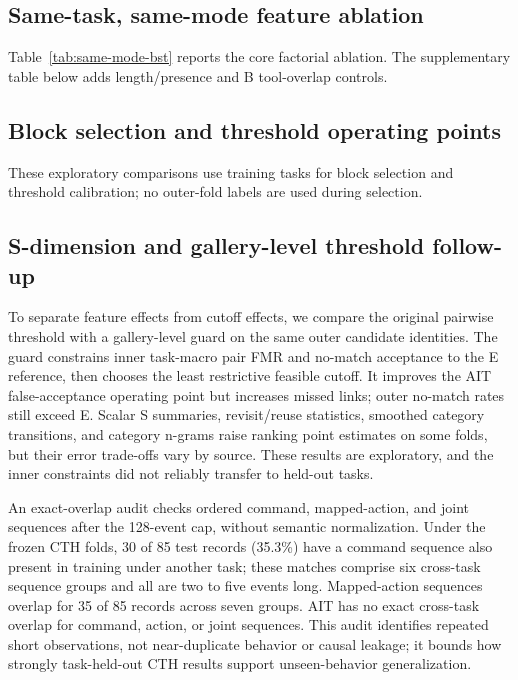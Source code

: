 \documentclass[10pt]{article}
\begin{document}



\subsection{Same-task, same-mode feature ablation}
Table~\ref{tab:same-mode-bst} reports the core factorial ablation. The supplementary table below adds length/presence and B tool-overlap controls.



\subsection{Block selection and threshold operating points}
These exploratory comparisons use training tasks for block selection and threshold calibration; no outer-fold labels are used during selection.



\subsection{S-dimension and gallery-level threshold follow-up}
To separate feature effects from cutoff effects, we compare the original pairwise threshold with a gallery-level guard on the same outer candidate identities. The guard constrains inner task-macro pair FMR and no-match acceptance to the E reference, then chooses the least restrictive feasible cutoff. It improves the AIT false-acceptance operating point but increases missed links; outer no-match rates still exceed E. Scalar S summaries, revisit/reuse statistics, smoothed category transitions, and category n-grams raise ranking point estimates on some folds, but their error trade-offs vary by source. These results are exploratory, and the inner constraints did not reliably transfer to held-out tasks.



An exact-overlap audit checks ordered command, mapped-action, and joint sequences after the 128-event cap, without semantic normalization. Under the frozen CTH folds, 30 of 85 test records (35.3\%) have a command sequence also present in training under another task; these matches comprise six cross-task sequence groups and all are two to five events long. Mapped-action sequences overlap for 35 of 85 records across seven groups. AIT has no exact cross-task overlap for command, action, or joint sequences. This audit identifies repeated short observations, not near-duplicate behavior or causal leakage; it bounds how strongly task-held-out CTH results support unseen-behavior generalization.
\end{document}
